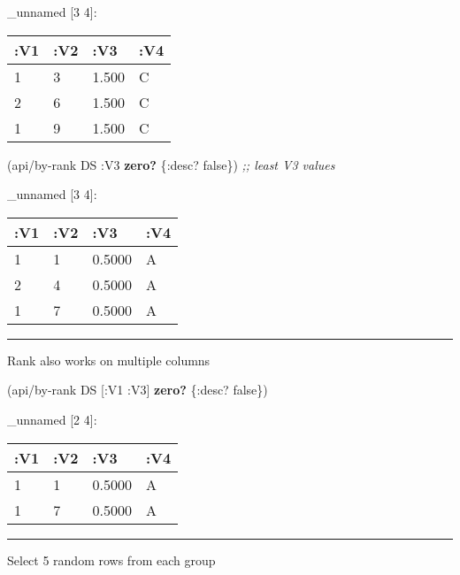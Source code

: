 \documentclass[]{article}
\newenvironment{Shaded}{\begin{snugshade}}{\end{snugshade}}
\newcommand{\KeywordTok}[1]{\textcolor[rgb]{0.13,0.29,0.53}{\textbf{#1}}}
\newcommand{\CommentTok}[1]{\textcolor[rgb]{0.56,0.35,0.01}{\textit{#1}}}
\newcommand{\VariableTok}[1]{\textcolor[rgb]{0.00,0.00,0.00}{#1}}
\newcommand{\AttributeTok}[1]{\textcolor[rgb]{0.77,0.63,0.00}{#1}}
\newcommand{\NormalTok}[1]{#1}
\begin{document}
\_unnamed {[}3 4{]}:

\begin{longtable}[]{@{}llll@{}}
\toprule
:V1 & :V2 & :V3 & :V4\tabularnewline
\midrule
\endhead
1 & 3 & 1.500 & C\tabularnewline
2 & 6 & 1.500 & C\tabularnewline
1 & 9 & 1.500 & C\tabularnewline
\bottomrule
\end{longtable}

\begin{Shaded}
\begin{Highlighting}[]
\NormalTok{(api/by-rank DS }\AttributeTok{:V3} \KeywordTok{zero?}\NormalTok{ \{}\AttributeTok{:desc}\NormalTok{? }\VariableTok{false}\NormalTok{\}) }\CommentTok{;; least V3 values}
\end{Highlighting}
\end{Shaded}

\_unnamed {[}3 4{]}:

\begin{longtable}[]{@{}llll@{}}
\toprule
:V1 & :V2 & :V3 & :V4\tabularnewline
\midrule
\endhead
1 & 1 & 0.5000 & A\tabularnewline
2 & 4 & 0.5000 & A\tabularnewline
1 & 7 & 0.5000 & A\tabularnewline
\bottomrule
\end{longtable}

\begin{center}\rule{0.5\linewidth}{0.5pt}\end{center}

Rank also works on multiple columns

\begin{Shaded}
\begin{Highlighting}[]
\NormalTok{(api/by-rank DS [}\AttributeTok{:V1} \AttributeTok{:V3}\NormalTok{] }\KeywordTok{zero?}\NormalTok{ \{}\AttributeTok{:desc}\NormalTok{? }\VariableTok{false}\NormalTok{\})}
\end{Highlighting}
\end{Shaded}

\_unnamed {[}2 4{]}:

\begin{longtable}[]{@{}llll@{}}
\toprule
:V1 & :V2 & :V3 & :V4\tabularnewline
\midrule
\endhead
1 & 1 & 0.5000 & A\tabularnewline
1 & 7 & 0.5000 & A\tabularnewline
\bottomrule
\end{longtable}

\begin{center}\rule{0.5\linewidth}{0.5pt}\end{center}

Select 5 random rows from each group
\end{document}
